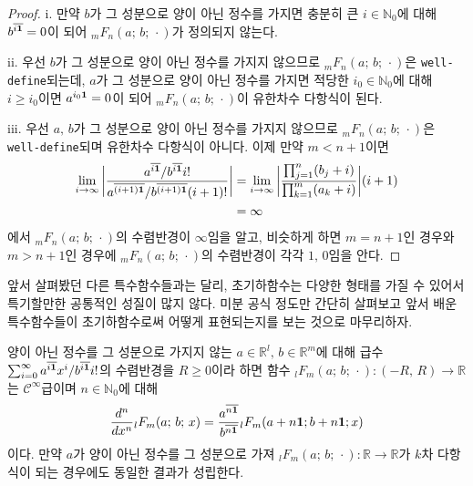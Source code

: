 \begin{proof}
    i. 만약 $b$가 그 성분으로 양이 아닌 정수를 가지면 충분히 큰 $i\in\mathbb{N}_0$에 대해 $b^{\overline{i\mathbf{1}}}=0$이 되어 $_mF_n(a;\,b;\,\cdot)$가 정의되지 않는다.

    ii. 우선 $b$가 그 성분으로 양이 아닌 정수를 가지지 않으므로 $_mF_n(a;\,b;\,\cdot)$은 \texttt{well-define}되는데, $a$가 그 성분으로 양이 아닌 정수를 가지면 적당한 $i_0\in\mathbb{N}_0$에 대해 $i\geq i_0$이면 $a^{i_0\mathbf{1}}=0$이 되어 $_mF_n(a;\,b;\,\cdot)$이 유한차수 다항식이 된다.

    iii. 우선 $a,\,b$가 그 성분으로 양이 아닌 정수를 가지지 않으므로 $_mF_n(a;\,b;\,\cdot)$은 \texttt{well-define}되며 유한차수 다항식이 아니다. 이제 만약 $m<n+1$이면
    \begin{align*}
        \lim_{i\to\infty}\bigg|\frac{a^{\overline{i\mathbf{1}}}/b^{\overline{i\mathbf{1}}}i!}{a^{\overline{(i+1)\mathbf{1}}}/b^{\overline{(i+1)\mathbf{1}}}(i+1)!}\bigg|&=\lim_{i\to\infty}\bigg|\frac{\prod_{j=1}^n(b_j+i)}{\prod_{k=1}^m(a_k+i)}\bigg|(i+1)\\
        &=\infty
    \end{align*}
    에서 $_mF_n(a;\,b;\,\cdot)$의 수렴반경이 $\infty$임을 알고, 비슷하게 하면 $m=n+1$인 경우와 $m>n+1$인 경우에 $_mF_n(a;\,b;\,\cdot)$의 수렴반경이 각각 $1,\,0$임을 안다.
\end{proof}

앞서 살펴봤던 다른 특수함수들과는 달리, 초기하함수는 다양한 형태를 가질 수 있어서 특기할만한 공통적인 성질이 많지 않다. 미분 공식 정도만 간단히 살펴보고 앞서 배운 특수함수들이 초기하함수로써 어떻게 표현되는지를 보는 것으로 마무리하자.

\begin{theorem}
    양이 아닌 정수를 그 성분으로 가지지 않는 $a\in\mathbb{R}^l,\,b\in\mathbb{R}^m$에 대해 급수 $\sum_{i=0}^\infty a^{\overline{i\mathbf{1}}}x^i/b^{\overline{i\mathbf{1}}}i!$의 수렴반경을 $R\geq0$이라 하면 함수 $_lF_m(a;\,b;\,\cdot):(-R,\,R)\to\mathbb{R}$는 $\mathcal{C}^\infty$급이며 $n\in\mathbb{N}_0$에 대해
    \begin{equation*}
        \frac{d^n}{dx^n}{}_lF_m(a;\,b;\,x)=\frac{a^{\overline{n\mathbf{1}}}}{b^{\overline{n\mathbf{1}}}}{}_lF_m(a+n\mathbf{1};b+n\mathbf{1};x)
    \end{equation*}
    이다. 만약 $a$가 양이 아닌 정수를 그 성분으로 가져 $_lF_m(a;\,b;\,\cdot):\mathbb{R}\to\mathbb{R}$가 $k$차 다항식이 되는 경우에도 동일한 결과가 성립한다.
\end{theorem}

